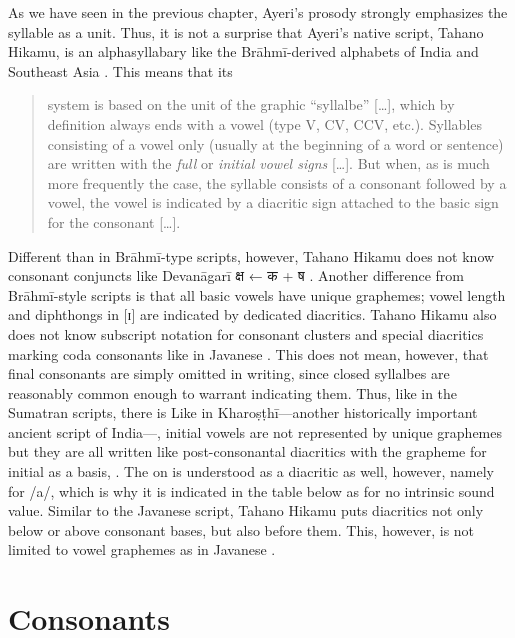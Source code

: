 As we have seen in the previous chapter, Ayeri's prosody strongly emphasizes 
the syllable as a unit. Thus, it is not a surprise that Ayeri's native script,
Tahano Hikamu, is an alphasyllabary like the Brāhmī-derived alphabets of India 
and Southeast Asia \parencites{salomon1996}{court1996}. This means that its 

\blockcquote[376]{salomon1996}{system is based on the unit of the graphic 
\enquote{syllalbe} […], which by definition always ends with a vowel (type V, 
CV, CCV, etc.). Syllables consisting of a vowel only (usually at the beginning 
of a word or sentence) are written with the \emph{full} or \emph{initial vowel 
signs} […]. But when, as is much more frequently the case, the syllable consists 
of a consonant followed by a vowel, the vowel is indicated by a diacritic sign 
attached to the basic sign for the consonant […].}

Different than in Brāhmī-type scripts, however, Tahano Hikamu does not know 
consonant conjuncts like Devanāgarī {\FS क्ष}  ← {\FS क} 
 + {\FS ष} . Another difference from Brāhmī-style scripts is 
that all basic vowels have unique graphemes; vowel length and diphthongs in [ɪ] 
are indicated by dedicated diacritics. Tahano Hikamu also does not know 
subscript notation for consonant clusters and special diacritics marking coda 
consonants like in Javanese \citep[478--479]{kuipersmcdermott1996}. This does 
not mean, however, that final consonants are simply omitted in writing, since 
closed syllalbes are reasonably common enough to warrant indicating them. Thus, 
like in the Sumatran scripts, there is 
 Like in Kharoṣṭhī---another historically important ancient script 
of India---, initial vowels are not represented by unique graphemes but they 
are all written like post-consonantal diacritics with the grapheme for initial 
 as a basis,  \citep[377]{salomon1996}. The  on 
 is understood as a diacritic as well, however, namely for /a/, which is 
why it is indicated in the table below as   for no intrinsic 
sound value. Similar to the Javanese script, Tahano Hikamu puts diacritics not 
only below or above consonant bases, but also before them. This, however, is 
not limited to vowel graphemes as in Javanese \citep[478]{kuipersmcdermott1996}.

\section{Consonants}

